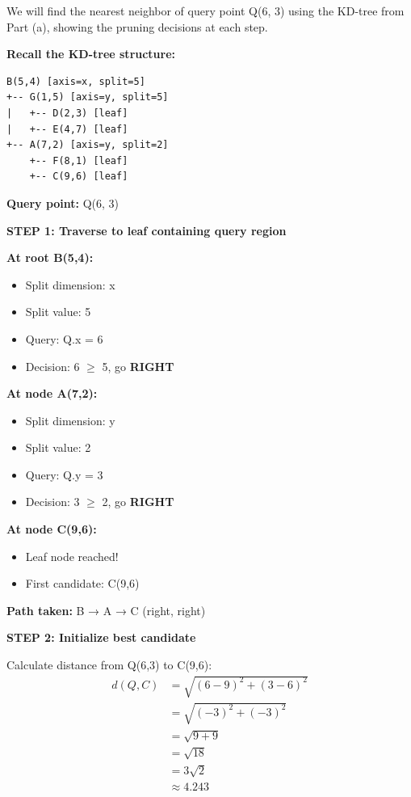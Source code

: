 \documentclass[12pt]{article}
\begin{document}
\begin{solution}
We will find the nearest neighbor of query point Q(6, 3) using the KD-tree from Part (a), showing the pruning decisions at each step.

\textbf{Recall the KD-tree structure:}
\begin{verbatim}
B(5,4) [axis=x, split=5]
+-- G(1,5) [axis=y, split=5]
|   +-- D(2,3) [leaf]
|   +-- E(4,7) [leaf]
+-- A(7,2) [axis=y, split=2]
    +-- F(8,1) [leaf]
    +-- C(9,6) [leaf]
\end{verbatim}

\textbf{Query point:} Q(6, 3)

\textbf{STEP 1: Traverse to leaf containing query region}

\textbf{At root B(5,4):}
\begin{itemize}
    \item Split dimension: x
    \item Split value: 5
    \item Query: Q.x = 6
    \item Decision: 6 $\geq$ 5, go \textbf{RIGHT}
\end{itemize}

\textbf{At node A(7,2):}
\begin{itemize}
    \item Split dimension: y
    \item Split value: 2
    \item Query: Q.y = 3
    \item Decision: 3 $\geq$ 2, go \textbf{RIGHT}
\end{itemize}

\textbf{At node C(9,6):}
\begin{itemize}
    \item Leaf node reached!
    \item First candidate: C(9,6)
\end{itemize}

\textbf{Path taken:} B → A → C (right, right)

\textbf{STEP 2: Initialize best candidate}

Calculate distance from Q(6,3) to C(9,6):
\begin{align*}
d(Q, C) &= \sqrt{(6-9)^2 + (3-6)^2} \\
&= \sqrt{(-3)^2 + (-3)^2} \\
&= \sqrt{9 + 9} \\
&= \sqrt{18} \\
&= 3\sqrt{2} \\
&\approx 4.243
\end{align*}


\end{solution}
\end{document}
